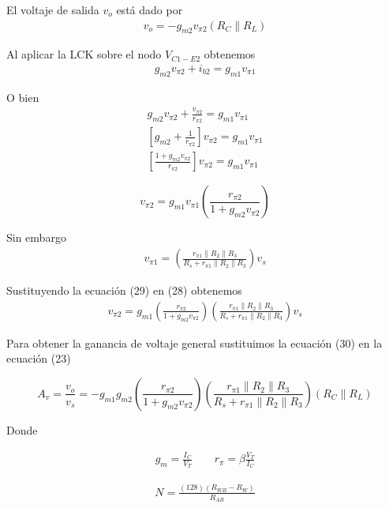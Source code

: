 \documentclass[12pt]{article}
\begin{document}
\noindent El voltaje de salida $v_o$ está dado por
\begin{align}
	v_o = -g_{m2}v_{\pi 2} (R_C \parallel R_L)
\end{align}

\noindent Al aplicar la LCK sobre el nodo $V_{C1 - E2}$ obtenemos
\begin{align}
	g_{m2}v_{\pi 2} + i_{b2} = g_{m1}v_{\pi 1} 
\end{align}

\noindent O bien
\begin{align}
	g_{m2}v_{\pi 2} + \frac{v_{\pi 2}}{r_{\pi 2}} = g_{m1}v_{\pi 1}\\
	\left[ g_{m2} + \frac{1}{r_{\pi 2}} \right]v_{\pi 2} = g_{m1}v_{\pi 1}\\
	\left[  \frac{1 + g_{m2}v_{\pi 2} }{ r_{\pi 2} } \right]v_{\pi 2} = g_{m1}v_{\pi 1}
\end{align}

\begin{tcolorbox}[colback=red!5!white,colframe=red!75!black,arc=0mm,boxrule=0mm,width=(\linewidth+0.5cm)]
	\begin{equation}
		v_{\pi 2} = g_{m1}v_{\pi 1} \left( \frac{ r_{\pi 2} }{ 1 + g_{m2}v_{\pi 2} }  \right) 
	\end{equation}
\end{tcolorbox}

\noindent Sin embargo
\begin{align}
	v_{\pi 1} = \left( \frac{ r_{\pi 1} \parallel R_2 \parallel R_3 }{ R_s + r_{\pi 1} \parallel R_2 \parallel R_3  } \right)v_s 
\end{align}

\noindent Sustituyendo la ecuación (29) en (28) obtenemos
\begin{align}
	v_{\pi 2} = g_{m1}\left( \frac{ r_{\pi 2} }{ 1 + g_{m2}v_{\pi 2} }  \right) \left( \frac{ r_{\pi 1} \parallel R_2 \parallel R_3 }{ R_s + r_{\pi 1} \parallel R_2 \parallel R_3  } \right)v_s
\end{align}
 
 \noindent Para obtener la ganancia de voltaje general sustituimos la ecuación (30) en la ecuación (23)
\begin{tcolorbox}[colback=red!5!white,colframe=red!75!black,arc=0mm,boxrule=0mm,width=(\linewidth+0.5cm)]
	\begin{equation}
		A_v = \frac{v_o}{v_s}= -g_{m1}g_{m2} \left( \frac{ r_{\pi 2} }{ 1 + g_{m2}v_{\pi 2} }  \right) \left( \frac{ r_{\pi 1} \parallel R_2 \parallel R_3 }{ R_s + r_{\pi 1} \parallel R_2 \parallel R_3  } \right)\left( R_C \parallel R_L \right)
	\end{equation}
\end{tcolorbox}
 
 \noindent Donde
 
 \begin{align}
 	g_m = \frac{I_C}{V_T} \quad \quad r_{\pi} = \beta \frac{V_T}{I_C}
 \end{align}
 
\begin{align}
	N = \frac{(128)(R_{WB} - R_W)}{R_{AB}} 
\end{align}
 
\end{document}
